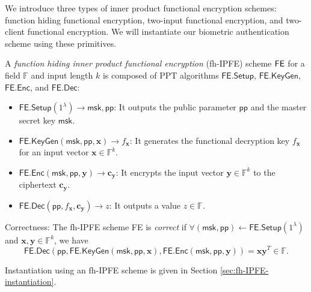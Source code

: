 We introduce three types of inner product functional encryption schemes: function hiding functional encryption, two-input functional encryption, and two-client functional encryption. We will instantiate our biometric authentication scheme using these primitives.

\begin{definition}
\label{def:fh-IPFE}
	A \emph{function hiding inner product functional encryption} (fh-IPFE) scheme $\sf FE$ for a field $\mathbb{F}$ and input length $k$ is composed of PPT algorithms $\textsf{FE.Setup}$, $\textsf{FE.KeyGen}$, $\textsf{FE.Enc}$, and $\textsf{FE.Dec}$:

	\begin{itemize}
	
		\item $\textsf{FE.Setup}(1^\lambda) \to \textsf{msk}, \textsf{pp}$: It outputs the public parameter $\textsf{pp}$ and the master secret key $\textsf{msk}$.
	
		\item $\textsf{FE.KeyGen}(\textsf{msk}, \textsf{pp}, \mathbf{x}) \to f_\mathbf{x}$: It generates the functional decryption key $f_\mathbf{x}$ for an input vector $\mathbf{x} \in \mathbb{F}^k$. 
	
		\item $\textsf{FE.Enc}(\textsf{msk}, \textsf{pp}, \mathbf{y}) \to \mathbf{c_y}$: It encrypts the input vector $\mathbf{y} \in \mathbb{F}^k$ to the ciphertext $\mathbf{c_y}$. 
	
		\item $\textsf{FE.Dec}(\textsf{pp}, f_\mathbf{x}, \mathbf{c_y}) \to z$: It outputs a value $z \in \mathbb{F}$.
	
	\end{itemize}
	
	\noindent Correctness: The fh-IPFE scheme \textsf{FE} is \emph{correct} if $\forall (\textsf{msk}, \textsf{pp}) \gets \textsf{FE.Setup}(1^\lambda)$ and $ \mathbf{x}, \mathbf{y} \in \mathbb{F}^k$, we have
	\[
		\textsf{FE.Dec}( \textsf{pp}, \textsf{FE.KeyGen}(\textsf{msk}, \textsf{pp}, \mathbf{x}), \textsf{FE.Enc}(\textsf{msk}, \textsf{pp}, \mathbf{y}) ) = \mathbf{x} \mathbf{y}^T \in \mathbb{F}.
	\]

\end{definition}

Instantiation using an fh-IPFE scheme is given in Section \ref{sec:fh-IPFE-instantiation}.

